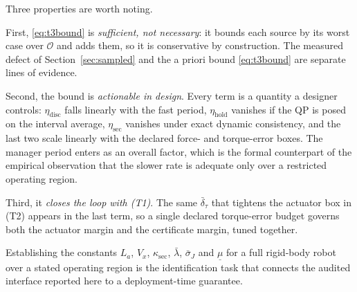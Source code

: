 \documentclass[journal]{IEEEtran}
\begin{document}
Three properties are worth noting.

First, \eqref{eq:t3bound} is \emph{sufficient, not necessary}: it bounds each
source by its worst case over $\mathcal O$ and adds them, so it is conservative
by construction. The measured defect of Section~\ref{sec:sampled} and the
a priori bound \eqref{eq:t3bound} are separate lines of evidence.

Second, the bound is \emph{actionable in design}. Every term is a quantity a
designer controls: $\eta_{\mathrm{disc}}$ falls linearly with the fast period,
$\eta_{\mathrm{hold}}$ vanishes if the QP is posed on the interval average,
$\eta_{\mathrm{sec}}$ vanishes under exact dynamic consistency, and the last two
scale linearly with the declared force- and torque-error boxes. The manager
period enters as an overall factor, which is the formal counterpart of the
empirical observation that the slower rate is adequate only over a restricted
operating region.

Third, it \emph{closes the loop with (T1)}. The same $\bar\delta_\tau$ that
tightens the actuator box in (T2) appears in the last term, so a single declared
torque-error budget governs both the actuator margin and the certificate margin,
tuned together.

Establishing the constants $L_a$, $V_x$, $\kappa_{\mathrm{sec}}$, $\bar\lambda$,
$\bar\sigma_J$ and $\underline\mu$ for a full rigid-body robot over a stated
operating region is the identification task that connects the audited interface
reported here to a deployment-time guarantee.
\end{document}
